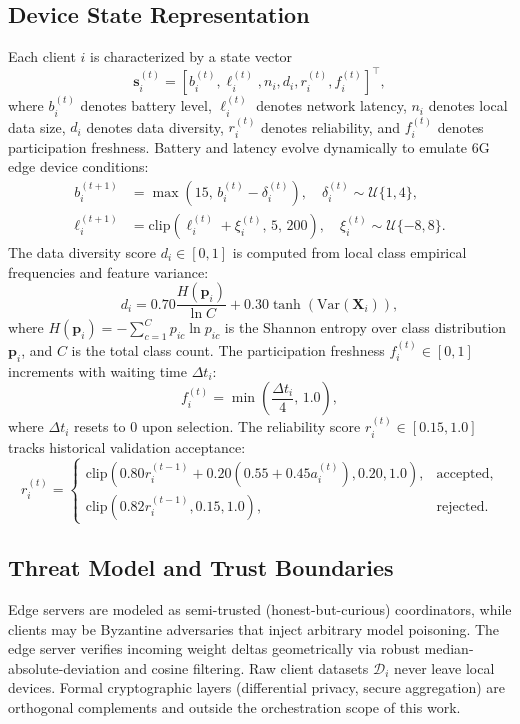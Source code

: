 \documentclass[conference]{IEEEtran}
\begin{document}
\subsection{Device State Representation}
Each client $i$ is characterized by a state vector
\begin{equation}
\mathbf{s}_i^{(t)} = \left[b_i^{(t)}, \ell_i^{(t)}, n_i, d_i, r_i^{(t)}, f_i^{(t)} \right]^{\top},
\end{equation}
where $b_i^{(t)}$ denotes battery level, $\ell_i^{(t)}$ denotes network latency, $n_i$ denotes local data size, $d_i$ denotes data diversity, $r_i^{(t)}$ denotes reliability, and $f_i^{(t)}$ denotes participation freshness. Battery and latency evolve dynamically to emulate 6G edge device conditions:
\begin{align}
b_i^{(t+1)} &= \max\left(15, \, b_i^{(t)} - \delta_i^{(t)}\right), \quad \delta_i^{(t)} \sim \mathcal{U}\{1, 4\}, \\
\ell_i^{(t+1)} &= \mathrm{clip}\left(\ell_i^{(t)} + \xi_i^{(t)}, \, 5, \, 200 \right), \quad \xi_i^{(t)} \sim \mathcal{U}\{-8, 8\}.
\end{align}
The data diversity score $d_i \in [0, 1]$ is computed from local class empirical frequencies and feature variance:
\begin{equation}
d_i = 0.70 \frac{H(\mathbf{p}_i)}{\ln C} + 0.30 \tanh\left(\mathrm{Var}(\mathbf{X}_i)\right),
\end{equation}
where $H(\mathbf{p}_i) = -\sum_{c=1}^C p_{ic} \ln p_{ic}$ is the Shannon entropy over class distribution $\mathbf{p}_i$, and $C$ is the total class count. The participation freshness $f_i^{(t)} \in [0, 1]$ increments with waiting time $\Delta t_i$:
\begin{equation}
f_i^{(t)} = \min\left(\frac{\Delta t_i}{4}, \, 1.0\right),
\end{equation}
where $\Delta t_i$ resets to 0 upon selection. The reliability score $r_i^{(t)} \in [0.15, 1.0]$ tracks historical validation acceptance:
\begin{equation}
r_i^{(t)} = \begin{cases}
\mathrm{clip}\left(0.80 r_i^{(t-1)} + 0.20(0.55 + 0.45 a_i^{(t)}), 0.20, 1.0\right), & \text{accepted}, \\
\mathrm{clip}\left(0.82 r_i^{(t-1)}, 0.15, 1.0\right), & \text{rejected}.
\end{cases}
\end{equation}

\subsection{Threat Model and Trust Boundaries}
Edge servers are modeled as semi-trusted (honest-but-curious) coordinators, while clients may be Byzantine adversaries that inject arbitrary model poisoning. The edge server verifies incoming weight deltas geometrically via robust median-absolute-deviation and cosine filtering. Raw client datasets $\mathcal{D}_i$ never leave local devices. Formal cryptographic layers (differential privacy, secure aggregation) are orthogonal complements and outside the orchestration scope of this work.
\end{document}
